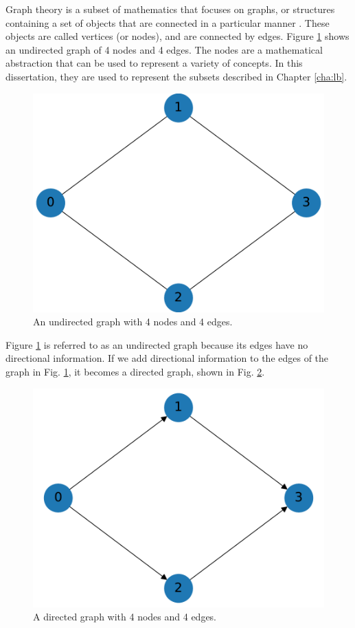 Graph theory is a subset of mathematics that focuses on graphs, or structures containing a set of objects that are connected in a particular manner \cite{graphtheory}.
These objects are called vertices (or nodes), and are connected by edges.
Figure \ref{basic_graph} shows an undirected graph of 4 nodes and 4 edges. The nodes are a mathematical abstraction that can be used to represent a variety of concepts. In this dissertation, they are used to represent the subsets described in Chapter \ref{cha:lb}.
\begin{figure}[H]
\centering
\includegraphics[scale=0.5]{../../figures/undirected_graph.pdf}
\caption{An undirected graph with 4 nodes and 4 edges. }
\label{basic_graph}
\end{figure}
Figure \ref{basic_graph} is referred to as an undirected graph because its edges have no directional information.
If we add directional information to the edges of the graph in Fig. \ref{basic_graph}, it becomes a directed graph, shown in Fig. \ref{directed_graph}.
\begin{figure}[H]
\centering
\includegraphics[scale=0.5]{../../figures/directed_graph.pdf}
\caption{A directed graph with 4 nodes and 4 edges. }
\label{directed_graph}
\end{figure}
